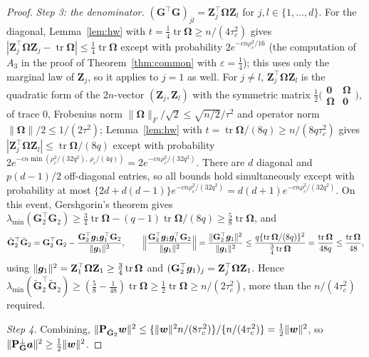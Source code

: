 \documentclass[11pt]{article}
\theoremstyle{definition}
\newcommand{\bZ}{\mathbf{Z}}
\newcommand{\bzero}{\mathbf{0}}
\newcommand{\bOm}{\boldsymbol{\Omega}}
\newcommand{\tr}{\operatorname{tr}}
\begin{document}
\begin{proof}
\emph{Step 3: the denominator.} $(\mathbf G^\top\mathbf G)_{jl}=\bZ_j^\top\bOm\bZ_l$ for $j,l\in\{1,\dots,d\}$. For the diagonal, Lemma~\ref{lem:hw} with $t=\tfrac14\tr\bOm\ge n/(4\tau_c^2)$ gives $|\bZ_j^\top\bOm\bZ_j-\tr\bOm|\le\tfrac14\tr\bOm$ except with probability $2e^{-cn\rho_c^2/16}$ (the computation of $A_3$ in the proof of Theorem~\ref{thm:common} with $\varepsilon=\tfrac14$); this uses only the marginal law of $\bZ_j$, so it applies to $j=1$ as well. For $j\ne l$, $\bZ_j^\top\bOm\bZ_l$ is the quadratic form of the $2n$-vector $(\bZ_j,\bZ_l)$ with the symmetric matrix $\tfrac12\bigl(\begin{smallmatrix}\bzero&\bOm\\\bOm&\bzero\end{smallmatrix}\bigr)$, of trace $0$, Frobenius norm $\|\bOm\|_F/\sqrt2\le\sqrt{n/2}/\tau^2$ and operator norm $\|\bOm\|/2\le1/(2\tau^2)$; Lemma~\ref{lem:hw} with $t=\tr\bOm/(8q)\ge n/(8q\tau_c^2)$ gives $|\bZ_j^\top\bOm\bZ_l|\le\tr\bOm/(8q)$ except with probability $2e^{-cn\min(\rho_c^2/(32q^2),\,\rho_c/(4q))}=2e^{-cn\rho_c^2/(32q^2)}$. There are $d$ diagonal and $p(d-1)/2$ off-diagonal entries, so all bounds hold simultaneously except with probability at most $\{2d+d(d-1)\}e^{-cn\rho_c^2/(32q^2)}=d(d+1)e^{-cn\rho_c^2/(32q^2)}$. On this event, Gershgorin's theorem gives $\lambda_{\min}(\mathbf G_2^\top\mathbf G_2)\ge\tfrac34\tr\bOm-(q-1)\tr\bOm/(8q)\ge\tfrac58\tr\bOm$, and
\[
\tilde{\mathbf G}_2^\top\tilde{\mathbf G}_2=\mathbf G_2^\top\mathbf G_2-\frac{\mathbf G_2^\top\bg_1\bg_1^\top\mathbf G_2}{\|\bg_1\|^2},\qquad
\Big\|\frac{\mathbf G_2^\top\bg_1\bg_1^\top\mathbf G_2}{\|\bg_1\|^2}\Big\|=\frac{\|\mathbf G_2^\top\bg_1\|^2}{\|\bg_1\|^2}\le\frac{q\{\tr\bOm/(8q)\}^2}{\tfrac34\tr\bOm}=\frac{\tr\bOm}{48q}\le\frac{\tr\bOm}{48},
\]
using $\|\bg_1\|^2=\bZ_1^\top\bOm\bZ_1\ge\tfrac34\tr\bOm$ and $(\mathbf G_2^\top\bg_1)_j=\bZ_j^\top\bOm\bZ_1$. Hence $\lambda_{\min}(\tilde{\mathbf G}_2^\top\tilde{\mathbf G}_2)\ge(\tfrac58-\tfrac1{48})\tr\bOm\ge\tfrac12\tr\bOm\ge n/(2\tau_c^2)$, more than the $n/(4\tau_c^2)$ required.

\emph{Step 4.} Combining, $\|\mathbf P_{\tilde{\mathbf G}_2}\bm{w}\|^2\le\{\|\bm{w}\|^2n/(8\tau_c^2)\}/\{n/(4\tau_c^2)\}=\tfrac12\|\bm{w}\|^2$, so $\|\mathbf P^\perp_{\mathbf G}\bm a\|^2\ge\tfrac12\|\bm{w}\|^2$.
\end{proof}
\end{document}
